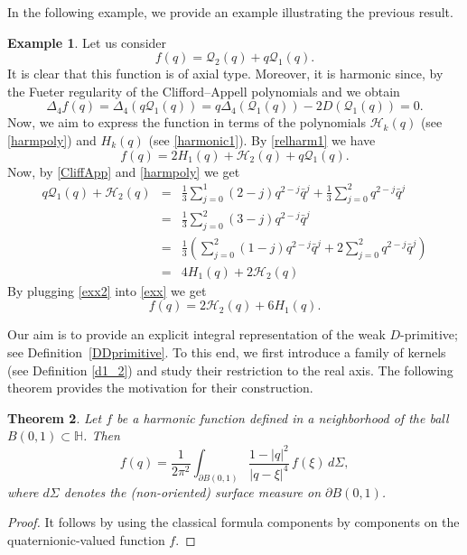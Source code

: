 \documentclass[reqno,11pt]{amsart}
\numberwithin{equation}{section}
\newtheorem{theorem}{Theorem}[section]
\theoremstyle{definition}
\newtheorem{example}[theorem]{Example}
\begin{document}
In the following example, we provide an example illustrating the previous result.

\begin{example}
	Let us consider
$$
	f(q)=  \mathcal{Q}_2(q)+q \mathcal{Q}_1(q).
$$
	It is clear that this function is of axial type. Moreover, it is harmonic since, by the Fueter regularity of the Clifford--Appell polynomials and \cite[Thm. 2.82]{CDS2025} we obtain
$$
	\Delta_4 f(q)= \Delta_4( q \mathcal{Q}_1(q))
	= q \Delta_4 (\mathcal{Q}_1(q)) - 2 D (\mathcal{Q}_1(q)) = 0.
$$
	Now, we aim to express the function in terms of the polynomials $\mathcal{H}_k(q)$ (see \eqref{harmpoly}) and $H_k(q)$ (see \eqref{harmonic1}). By \eqref{relharm1} we have
	\begin{equation}
	\label{exx}
	f(q)= 2 H_1(q)+ \mathcal{H}_2(q)+q \mathcal{Q}_1(q).
	\end{equation}
Now, by \eqref{CliffApp} and \eqref{harmpoly} we get
\begin{eqnarray}
\nonumber
q \mathcal{Q}_1(q)+ \mathcal{H}_2(q)&=& \frac{1}{3} \sum_{j=0}^1 (2-j) q^{2-j} \bar{q}^j+ \frac{1}{3} \sum_{j=0}^2 q^{2-j} \bar{q}^j\\
\nonumber
&=& \frac{1}{3} \sum_{j=0}^2 (3-j) q^{2-j} \bar{q}^j\\
\nonumber
&=& \frac{1}{3} \left( \sum_{j=0}^{2} (1-j) q^{2-j} \bar{q}^{j}+2 \sum_{j=0}^{2} q^{2-j} \bar{q}^j\right)\\
\label{exx2}
&=& 4 H_1(q)+2\mathcal{H}_2(q)
\end{eqnarray}	
By plugging \eqref{exx2} into \eqref{exx} we get
$$ f(q)= 2 \mathcal{H}_2(q)+6 H_1(q).$$
\end{example}
Our aim is to provide an explicit integral representation of the weak $D$-primitive; see Definition~\ref{DDprimitive}. To this end, we first introduce a family of kernels (see Definition \ref{d1_2}) and study their restriction to the real axis. The following theorem provides the motivation for their construction.

\begin{theorem} \label{rep_har}
	Let $f$ be a harmonic function defined in a neighborhood of the ball $B(0,1)\subset \mathbb{H}$. Then
	\begin{equation}
		\label{hp}
		f(q)=\frac{1}{2 \pi^2} \int_{\partial B(0,1)} \frac{1-|q|^2}{|q-\xi|^4} \, f(\xi)\, d\Sigma,
	\end{equation}
	where $d\Sigma$ denotes the (non-oriented) surface measure on $\partial B(0,1)$.
\end{theorem}
\begin{proof}
	It follows by using the classical formula components by components on the quaternionic-valued function $f$.
\end{proof}
\end{document}

